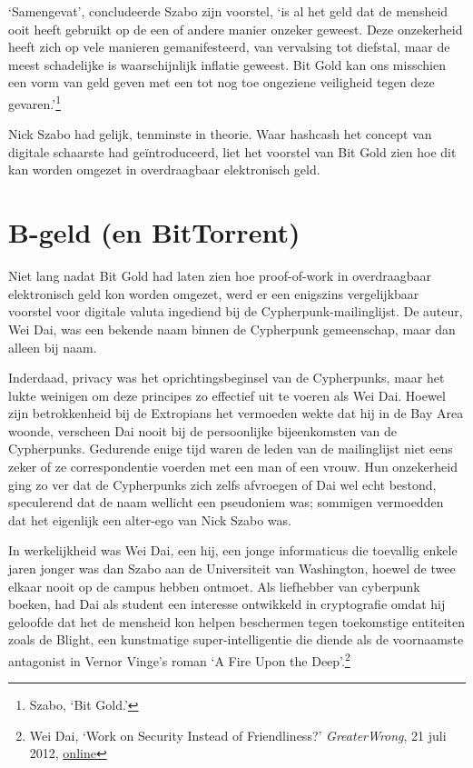 \documentclass[
  a5paper,
  smalldemyvopaper,11pt,twoside,onecolumn,openright,extrafontsizes]{memoir}
\begin{document}
`Samengevat', concludeerde Szabo zijn voorstel, `is al het geld dat de
mensheid ooit heeft gebruikt op de een of andere manier onzeker geweest.
Deze onzekerheid heeft zich op vele manieren gemanifesteerd, van
vervalsing tot diefstal, maar de meest schadelijke is waarschijnlijk
inflatie geweest. Bit Gold kan ons misschien een vorm van geld geven met
een tot nog toe ongeziene veiligheid tegen deze gevaren.'\footnote{Szabo,
  `Bit Gold.'}

Nick Szabo had gelijk, tenminste in theorie. Waar hashcash het concept
van digitale schaarste had geïntroduceerd, liet het voorstel van Bit
Gold zien hoe dit kan worden omgezet in overdraagbaar elektronisch geld.

\chapter{B-geld (en BitTorrent)}\label{b-geld-en-bittorrent}

Niet lang nadat Bit Gold had laten zien hoe proof-of-work in
overdraagbaar elektronisch geld kon worden omgezet, werd er een
enigszins vergelijkbaar voorstel voor digitale valuta ingediend bij de
Cypherpunk-mailinglijst. De auteur, Wei Dai, was een bekende naam binnen
de Cypherpunk gemeenschap, maar dan alleen bij naam.

Inderdaad, privacy was het oprichtingsbeginsel van de Cypherpunks, maar
het lukte weinigen om deze principes zo effectief uit te voeren als Wei
Dai. Hoewel zijn betrokkenheid bij de Extropians het vermoeden wekte dat
hij in de Bay Area woonde, verscheen Dai nooit bij de persoonlijke
bijeenkomsten van de Cypherpunks. Gedurende enige tijd waren de leden
van de mailinglijst niet eens zeker of ze correspondentie voerden met
een man of een vrouw. Hun onzekerheid ging zo ver dat de Cypherpunks
zich zelfs afvroegen of Dai wel echt bestond, speculerend dat de naam
wellicht een pseudoniem was; sommigen vermoedden dat het eigenlijk een
alter-ego van Nick Szabo was.

In werkelijkheid was Wei Dai, een hij, een jonge informaticus die
toevallig enkele jaren jonger was dan Szabo aan de Universiteit van
Washington, hoewel de twee elkaar nooit op de campus hebben ontmoet. Als
liefhebber van cyberpunk boeken, had Dai als student een interesse
ontwikkeld in cryptografie omdat hij geloofde dat het de mensheid kon
helpen beschermen tegen toekomstige entiteiten zoals de Blight, een
kunstmatige super-intelligentie die diende als de voornaamste antagonist
in Vernor Vinge's roman `A Fire Upon the Deep'.\footnote{Wei Dai, `Work
  on Security Instead of Friendliness?' \emph{GreaterWrong}, 21 juli
  2012,
  \href{https://www.greaterwrong.com/posts/m8FjhuELdg7iv6boW/work-on-security-instead-of-friendliness}{online}}
\end{document}
